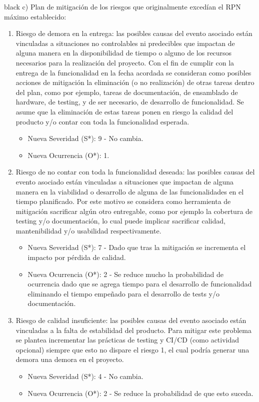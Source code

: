 \documentclass[
11pt, %
]{charter}
\begin{document}
\begin{consigna}{black}
c) Plan de mitigación de los riesgos que originalmente excedían el RPN máximo establecido:
\begin{enumerate}
	\item Riesgo de demora en la entrega: las posibles causas del evento asociado están vinculadas a situaciones no controlables ni predecibles que impactan de alguna manera en la disponibilidad de tiempo o alguno de los recursos necesarios para la realización del proyecto. Con el fin de cumplir con la entrega de la funcionalidad en la fecha acordada se consideran como posibles acciones de mitigación la eliminación (o no realización) de otras tareas dentro del plan, como por ejemplo, tareas de documentación, de ensamblado de hardware, de testing, y de ser necesario, de desarrollo de funcionalidad. Se asume que la eliminación de estas tareas ponen en riesgo la calidad del producto y/o contar con toda la funcionalidad esperada.
	\begin{itemize}
		\item Nueva Severidad (S*): 9 - No cambia.
		\item Nueva Ocurrencia (O*): 1.
	\end{itemize}
	
	\item Riesgo de no contar con toda la funcionalidad deseada: las posibles causas del evento asociado están vinculadas a situaciones que impactan de alguna manera en la viabilidad o desarrollo de alguna de las funcionalidades en el tiempo planificado. Por este motivo se considera como herramienta de mitigación sacrificar algún otro entregable, como por ejemplo la cobertura de testing y/o documentación, lo cual puede implicar sacrificar calidad, mantenibilidad y/o usabilidad respectivamente.
	\begin{itemize}
		\item Nueva Severidad (S*): 7 - Dado que tras la mitigación se incrementa el impacto por pérdida de calidad.
		\item Nueva Ocurrencia (O*): 2 - Se reduce mucho la probabilidad de ocurrencia dado que se agrega tiempo para el desarrollo de funcionalidad eliminando el tiempo empeñado para el desarrollo de tests y/o documentación.
	\end{itemize}
	
	
	\item Riesgo de calidad insuficiente: las posibles causas del evento asociado están vinculadas a la falta de estabilidad del producto. Para mitigar este problema se plantea incrementar las prácticas de testing y CI/CD (como actividad opcional) siempre que esto no dispare el riesgo 1, el cual podría generar una demora una demora en el proyecto.
	\begin{itemize}
		\item Nueva Severidad (S*): 4 - No cambia.
		\item Nueva Ocurrencia (O*): 2 - Se reduce la probabilidad de que esto suceda.
	\end{itemize}	
	

\end{enumerate}
\end{consigna}
\end{document}
